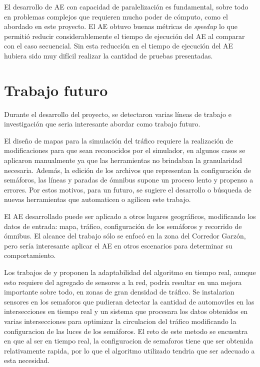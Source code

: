 El desarrollo de AE con capacidad de paralelización es fundamental, sobre todo en problemas complejos que requieren mucho poder de cómputo, como el abordado en este proyecto. El AE obtuvo buenas métricas de \emph{speedup} lo que permitió reducir considerablemente el tiempo de ejecución del AE al comparar con el caso secuencial. Sin esta reducción en el tiempo de ejecución del AE hubiera sido muy difícil realizar la cantidad de pruebas presentadas.

\section{Trabajo futuro}
Durante el desarrollo del proyecto, se detectaron varias líneas de trabajo e investigación que seria interesante abordar como trabajo futuro.

El diseño de mapas para la simulación del tráfico requiere la realización de modificaciones para que sean reconocidos por el simulador, en algunos casos se aplicaron manualmente ya que las herramientas no brindaban la granularidad necesaria. Además, la edición de los archivos que representan la configuración de semáforos, las líneas y paradas de ómnibus supone un proceso lento y propenso a errores. Por estos motivos, para un futuro, se sugiere el desarrollo o búsqueda de nuevas herramientas que automaticen o agilicen este trabajo.

El AE desarrollado puede ser aplicado a otros lugares geográficos, modificando  los datos de entrada: mapa, tráfico, configuración de los semáforos y recorrido de ómnibus. El alcance del trabajo sólo se enfocó en la zona del Corredor Garzón, pero sería interesante aplicar el AE en otros escenarios para determinar su comportamiento.

Los trabajos de  \citet{Montana1996} y \citet{Vogel2000} proponen la adaptabilidad del algoritmo en tiempo real, aunque esto requiere del agregado de sensores a la red, podría resultar en una mejora importante sobre todo, en zonas de gran densidad de tráfico. Se instalarian sensores en los semaforos que pudieran detectar la cantidad de automoviles en las intersecciones en tiempo real y un sistema que procesara los datos obtenidos en varias intersecciones para optimizar la circulacion del tráfico modificando la configuracion de las luces de los semáforos. El reto de este metodo se encuentra en que al ser en tiempo real, la configuracion de semaforos tiene que ser obtenida relativamente rapida, por lo que el algoritmo utilizado tendria que ser adecuado a esta necesidad.
